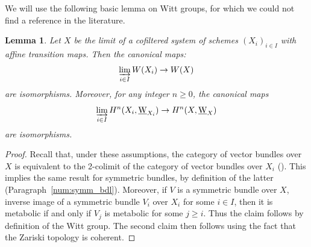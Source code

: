 \documentclass[11pt]{article}
\numberwithin{equation}{section}\renewcommand{\encodingdefault}{TU}
\newcommand{\uW}{\underline{\mathrm W}}
\DeclareMathOperator{\ilim}{\varinjlim}
\newtheorem{lm}[thm]{Lemma}
\theoremstyle{remark}
\theoremstyle{definition}
\numberwithin{equation}{thm}
\begin{document}
We will use the following basic lemma on Witt groups,
for which we could not find a reference in the literature.
\begin{lm}\label{lm:Witt_lim}
Let $X$ be the limit of a cofiltered system of schemes $(X_i)_{i \in I}$ with affine transition maps. Then the canonical maps:
\[
\ilim_{i \in I} W(X_i) \to W(X)
\]
are isomorphisms.
Moreover, for any integer $n \geqslant 0$, the canonical maps
\begin{equation*}\label{eq:unramf_Witt_coh&lim}
\ilim_{i \in I} H^n(X_i,\uW_{X_i}) \to H^n(X,\uW_X)
\end{equation*}
are isomorphisms.
\end{lm}
\begin{proof}
Recall that, under these assumptions, the category of vector bundles over~$X$ is equivalent to the 2-colimit of the category of vector bundles over $X_i$ (\cite[8.5.3--8.5.5]{EGA4}).
This implies the same result for symmetric bundles, by definition of the latter (Paragraph~\ref{num:symm_bdl}).
Moreover, if $V$ is a symmetric bundle over $X$, inverse image of a symmetric bundle $V_i$ over $X_i$ for some $i\in I$, then it is metabolic if and only if $V_j$ is metabolic for some $j\ge i$.
Thus the claim follows by definition of the Witt group.
The second claim then follows using the fact that the Zariski topology is coherent.
\end{proof}
\end{document}
